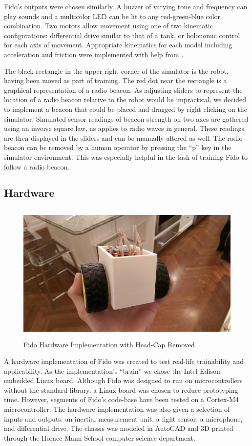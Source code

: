 Fido's outputs were chosen similarly.
A buzzer of varying tone and frequency can play sounds and a multicolor LED can be lit to any red-green-blue color combination.
Two motors allow movement using one of two kinematic configurations: differential drive similar to that of a tank, or holonomic control for each axis of movement.
Appropriate kinematics for each model including acceleration and friction were implemented with help from \cite{dudek}.

The black rectangle in the upper right corner of the simulator is the robot, having been moved as part of training.
The red dot near the rectangle is a graphical representation of a radio beacon.
As adjusting sliders to represent the location of a radio beacon relative to the robot would be impractical, we decided to implement a beacon that could be placed and dragged by right clicking on the simulator.
Simulated sensor readings of beacon strength on two axes are gathered using an inverse square law, as applies to radio waves in general.
These readings are then displayed in the sliders and can be manually altered as well.
The radio beacon can be removed by a human operator by pressing the ``p'' key in the simulator environment.
This was especially helpful in the task of training Fido to follow a radio beacon.

\subsection{Hardware}

\begin{figure}
	\centering
	\includegraphics[height=7cm]{Figures/Prototype.jpg}
	\caption{Fido Hardware Implementation with Head-Cap Removed}
\end{figure}


A hardware implementation of Fido was created to test real-life trainability and applicability.
 As the implementation's ``brain'' we chose the Intel Edison embedded Linux board.
Although Fido was designed to run on microcontrollers without the standard library, a Linux board was chosen to reduce prototyping time.
However, segments of Fido's code-base have been tested on a Cortex-M4 microcontroller.
 The hardware implementation was also given a selection of inputs and outputs: an inertial measurement unit, a light sensor, a microphone, and differential drive.
 The chassis was modeled in AutoCAD and 3D printed through the Horace Mann School computer science department.

